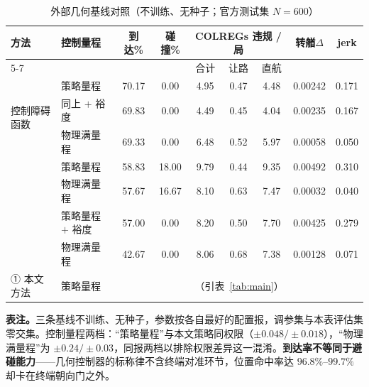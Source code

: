 \documentclass[12pt,letterpaper]{article}
\begin{document}
\begin{table}[htbp]
 \caption{外部几何基线对照（不训练、无种子；官方测试集 $N=600$）}
 \label{tab:ext}
 \centering\footnotesize
 \setlength{\tabcolsep}{4pt}
 \begin{tabular*}{\linewidth}{@{\extracolsep{\fill}}llccccccc@{}}
  \toprule
  \multirow{2}{*}{方法} & \multirow{2}{*}{控制量程} & \multirow{2}{*}{到达\%} & \multirow{2}{*}{碰撞\%}
   & \multicolumn{3}{c}{COLREGs 违规 / 局} & \multirow{2}{*}{转艏$\Delta$} & \multirow{2}{*}{jerk} \\
  \cmidrule(lr){5-7}
   & & & & 合计 & 让路 & 直航 & & \\
  \midrule
  \multirow{3}{*}{控制障碍函数}
   & 策略量程    & 70.17 & 0.00 & 4.95 & 0.47 & 4.48 & 0.00242 & 0.171 \\
   & 同上 $+$ 裕度 & 69.83 & 0.00 & 4.49 & 0.45 & 4.04 & 0.00235 & 0.167 \\
   & 物理满量程   & 69.33 & 0.00 & 6.48 & 0.52 & 5.97 & 0.00058 & 0.050 \\
  \addlinespace
  \multirow{2}{*}{PD 控制器}
   & 策略量程  & 58.83 & 18.00 & 9.79 & 0.44 & 9.35 & 0.00492 & 0.310 \\
   & 物理满量程 & 57.67 & 16.67 & 8.10 & 0.63 & 7.47 & 0.00032 & 0.040 \\
  \addlinespace
  \multirow{2}{*}{速度障碍}
   & 策略量程 $+$ 裕度 & 57.00 & 0.00 & 8.20 & 0.50 & 7.70 & 0.00425 & 0.279 \\
   & 物理满量程    & 42.67 & 0.00 & 8.06 & 0.68 & 7.38 & 0.00128 & 0.071 \\
  \addlinespace
  ① 本文方法 & 策略量程 & \multicolumn{7}{c}{（引表~\ref{tab:main}）} \\
  \bottomrule
 \end{tabular*}

 \vspace{4pt}\footnotesize
 \textbf{表注。}三条基线不训练、无种子，参数按各自最好的配置报，调参集与本表评估集零交集。控制量程两档：“策略量程”与本文策略同权限（$\pm0.048/\pm0.018$），“物理满量程”为 $\pm0.24/\pm0.03$，同报两档以排除权限差异这一混淆。\textbf{到达率不等同于避碰能力}——几何控制器的标称律不含终端对准环节，位置命中率达 $96.8\%$--$99.7\%$ 却卡在终端朝向门之外。
\end{table}
\end{document}

